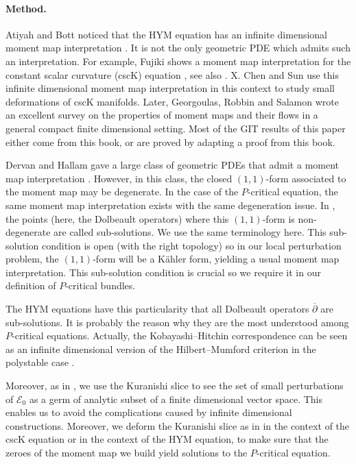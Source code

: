 \documentclass{article}
\theoremstyle{remark}
\theoremstyle{definition}
\newcommand{\E}{\mathcal{E}}
\newcommand{\dbar}{\overline{\partial}}
\begin{document}
\paragraph{Method.}

Atiyah and Bott noticed that the HYM equation has an infinite dimensional moment map interpretation \cite{Atiyah_Bott}. It is not the only geometric PDE which admits such an interpretation. For example, Fujiki shows a moment map interpretation for the constant scalar curvature (cscK) equation \cite{Fujiki}, see also \cite{Donaldson_97}. X. Chen and Sun use this infinite dimensional moment map interpretation in this context \cite{Chen_Sun} to study small deformations of cscK manifolds. Later, Georgoulas, Robbin and Salamon wrote an excellent survey \cite{GRS} on the properties of moment maps and their flows in a general compact finite dimensional setting. Most of the GIT results of this paper either come from this book, or are proved by adapting a proof from this book.

Dervan and Hallam gave a large class of geometric PDEs that admit a moment map interpretation \cite{Dervan_Hallam}. However, in this class, the closed $(1,1)$-form associated to the moment map may be degenerate. In the case of the $P$-critical equation, the same moment map interpretation exists with the same degeneration issue. In \cite{DMS}, the points (here, the Dolbeault operators) where this $(1,1)$-form is non-degenerate are called sub-solutions. We use the same terminology here. This sub-solution condition is open (with the right topology) so in our local perturbation problem, the $(1,1)$-form will be a Kähler form, yielding a usual moment map interpretation. This sub-solution condition is crucial so we require it in our definition of $P$-critical bundles.

The HYM equations have this particularity that all Dolbeault operators $\dbar$ are sub-solutions. It is probably the reason why they are the most understood among $P$-critical equations. Actually, the Kobayashi--Hitchin correspondence can be seen as an infinite dimensional version of the Hilbert--Mumford criterion in the polystable case \cite[Theorem 12.5]{GRS}.

Moreover, as in \cite{Buchdahl_Schumacher}, we use the Kuranishi slice to see the set of small perturbations of $\E_0$ as a germ of analytic subset of a finite dimensional vector space. This enables us to avoid the complications caused by infinite dimensional constructions. Moreover, we deform the Kuranishi slice as in \cite{Donaldson_08,Szkelyhidi,Sektnan_Tipler,Ortu_Sektnan,Ortu} in the context of the cscK equation or \cite{Clarke_Tipler,Delloque_2024} in the context of the HYM equation, to make sure that the zeroes of the moment map we build yield solutions to the $P$-critical equation.
\end{document}
